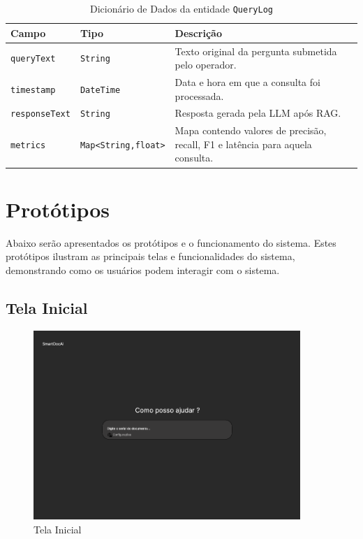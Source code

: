 \begin{description}
\begin{table}[H]
  \centering
  \caption{Dicionário de Dados da entidade \texttt{QueryLog}}
  \label{tab:dd_querylog}
  \begin{tabular}{|p{3cm}|p{4cm}|p{8cm}|}
    \hline
    \textbf{Campo}       & \textbf{Tipo}         & \textbf{Descrição} \\ \hline
    \texttt{queryText}    & \texttt{String}       & Texto original da pergunta submetida pelo operador. \\ \hline
    \texttt{timestamp}    & \texttt{DateTime}     & Data e hora em que a consulta foi processada. \\ \hline
    \texttt{responseText} & \texttt{String}       & Resposta gerada pela LLM após RAG. \\ \hline
    \texttt{metrics}      & \texttt{Map<String,float>} & Mapa contendo valores de precisão, recall, F1 e latência para aquela consulta. \\ \hline
  \end{tabular}
\end{table}

\section{Protótipos}
\label{sec:prototipos}
\noindent Abaixo serão apresentados os protótipos e o funcionamento do sistema. Estes protótipos ilustram as principais telas e funcionalidades do sistema, demonstrando como os usuários podem interagir com o sistema.


\subsection{Tela Inicial}
\label{subsec:tela_inicial}

\begin{figure}[H]
  \centering
  \includegraphics[width=0.9\textwidth]{04-figuras/inicio.png}
  \caption{Tela Inicial}
  \label{fig:tela-inical}
\end{figure}



\end{description}
